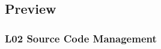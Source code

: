 %
%
%
%
%
%
%
%

\subsection{Preview}

\begin{frame}
	\frametitle{L02 Source Code Management}
\end{frame}



\nocite{raab2017introducing}

\appendix

\begin{frame}[allowframebreaks]
	
	
\end{frame}




